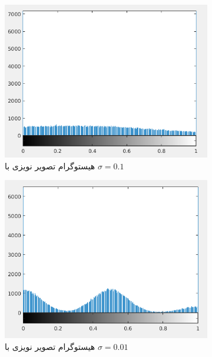 \documentclass[11.5pt,a4paper]{article}
\begin{document}
\begin{figure}[h]
	\begin{subfigure}{0.3\textwidth}
	\includegraphics[scale=0.3]{Imgs/MRF_S1_Hist.png}
	\caption{هیستوگرام تصویر نویزی با $\sigma=0.1$}
	\end{subfigure}
	\begin{subfigure}{0.3\textwidth}
	\includegraphics[scale=0.3]{Imgs/MRF_S01_Hist.png}
	\caption{هیستوگرام تصویر نویزی با $\sigma=0.01$}
	\end{subfigure}	
	\begin{subfigure}{0.3\textwidth}

\end{subfigure}
\end{figure}
\end{document}
